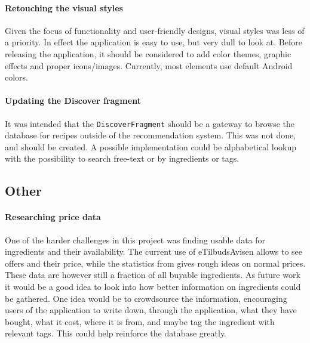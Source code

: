 \paragraph{Retouching the visual styles}
Given the focus of functionality and user-friendly designs, visual styles was less of a priority. In effect the application is easy to use, but very dull to look at. Before releasing the application, it should be considered to add color themes, graphic effects and proper icons/images. Currently, most elements use default Android colors.

\paragraph{Updating the Discover fragment}
It was intended that the \texttt{DiscoverFragment} should be a gateway to browse the database for recipes outside of the recommendation system. This was not done, and should be created. A possible implementation could be alphabetical lookup with the possibility to search free-text or by ingredients or tags.

\subsection{Other}

\paragraph{Researching price data}
One of the harder challenges in this project was finding usable data for ingredients and their availability. The current use of eTilbudsAvisen allows to see offers and their price, while the statistics from  gives rough ideas on normal prices.
These data are however still a fraction of all buyable ingredients. As future work it would be a good idea to look into how better information on ingredients could be gathered.
One idea would be to crowdsource the information, encouraging users of the application to write down, through the application, what they have bought, what it cost, where it is from, and maybe tag the ingredient with relevant tags. This could help reinforce the database greatly.